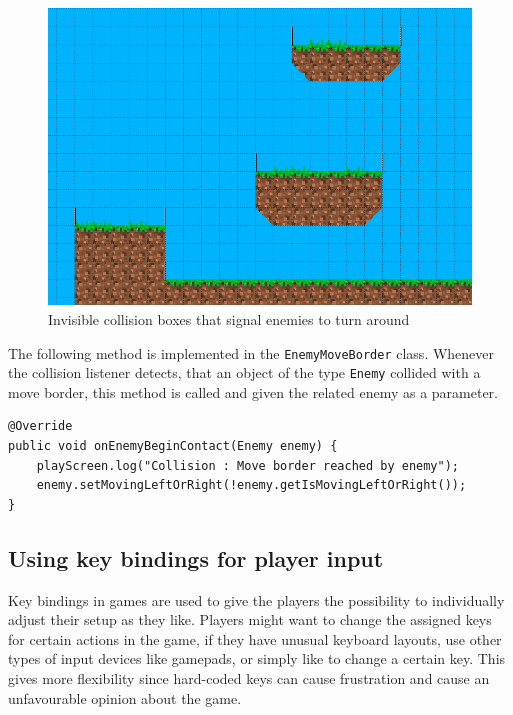 \documentclass[12p]{article}
\begin{document}
\begin{figure}[ht]
  \center
  \includegraphics[width=1\textwidth]{Documentation/enemyMoveBorders}
  \caption{Invisible collision boxes that signal enemies to turn around}
  \label{fig:EnemyMoveBorders}
\end{figure}

The following method is implemented in the \texttt{EnemyMoveBorder} class. Whenever the collision listener detects, that an object of the type \texttt{Enemy} collided with a move border, this method is called and given the related enemy as a parameter.

\begin{verbatim}
@Override
public void onEnemyBeginContact(Enemy enemy) {
    playScreen.log("Collision : Move border reached by enemy");
    enemy.setMovingLeftOrRight(!enemy.getIsMovingLeftOrRight());
}
\end{verbatim}


\newpage
\subsection{Using key bindings for player input} \label{DocKeyBindings}

Key bindings in games are used to give the players the possibility to individually adjust their setup as they like. Players might want to change the assigned keys for certain actions in the game, if they have unusual keyboard layouts, use other types of input devices like gamepads, or simply like to change a certain key. This gives more flexibility since hard-coded keys can cause frustration and cause an unfavourable opinion about the game.
\end{document}

